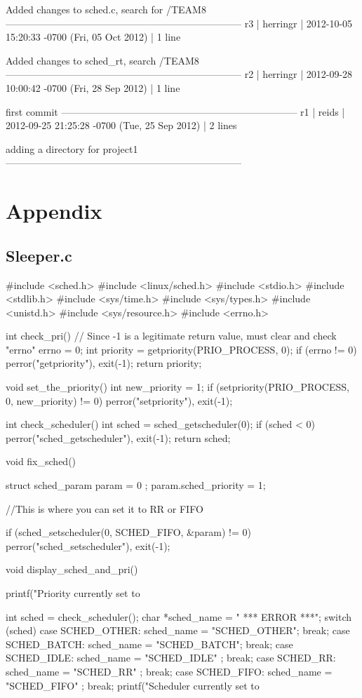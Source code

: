 \documentclass[letterpaper,10pt]{article}
\begin{document}
Added changes to sched.c, search for /TEAM8
------------------------------------------------------------------------
r3 | herringr | 2012-10-05 15:20:33 -0700 (Fri, 05 Oct 2012) | 1 line

Added changes to sched\_rt, search /TEAM8
------------------------------------------------------------------------
r2 | herringr | 2012-09-28 10:00:42 -0700 (Fri, 28 Sep 2012) | 1 line

first commit
------------------------------------------------------------------------
r1 | reids | 2012-09-25 21:25:28 -0700 (Tue, 25 Sep 2012) | 2 lines

adding a directory for project1
------------------------------------------------------------------------
\section{Appendix}
\subsection{Sleeper.c}
#include <sched.h>
#include <linux/sched.h>
#include <stdio.h>
#include <stdlib.h>
#include <sys/time.h>
#include <sys/types.h>
#include <unistd.h>
#include <sys/resource.h>
#include <errno.h>

int check\_pri() {
   // Since -1 is a legitimate return value, must clear and check "errno"
   errno = 0;
   int priority = getpriority(PRIO\_PROCESS, 0);
   if (errno != 0)
      perror("getpriority"), exit(-1);
   return priority;
}

void set\_the\_priority() {
   int new\_priority = 1;
   if (setpriority(PRIO\_PROCESS, 0, new\_priority) != 0)
      perror("setpriority"), exit(-1);
}


int check\_scheduler() {
   int sched = sched\_getscheduler(0);
   if (sched < 0)
      perror("sched\_getscheduler"), exit(-1);
   return sched;
}

void fix\_sched() {
   struct sched\_param param = { 0 };
   param.sched\_priority = 1;

   //This is where you can set it to RR or FIFO

   if (sched\_setscheduler(0, SCHED\_FIFO, &param) != 0) 
      perror("sched\_setscheduler"), exit(-1);
}

void display\_sched\_and\_pri() {
   printf("Priority currently set to %

   int sched = check\_scheduler();
   char *sched\_name = " *** ERROR ***";
   switch (sched) {
      case SCHED\_OTHER: sched\_name = "SCHED\_OTHER"; break;
      case SCHED\_BATCH: sched\_name = "SCHED\_BATCH"; break;
      case SCHED\_IDLE:  sched\_name = "SCHED\_IDLE" ; break;
      case SCHED\_RR:    sched\_name = "SCHED\_RR"   ; break;
      case SCHED\_FIFO:  sched\_name = "SCHED\_FIFO" ; break;
   }
   printf("Scheduler currently set to %
}
\end{document}
